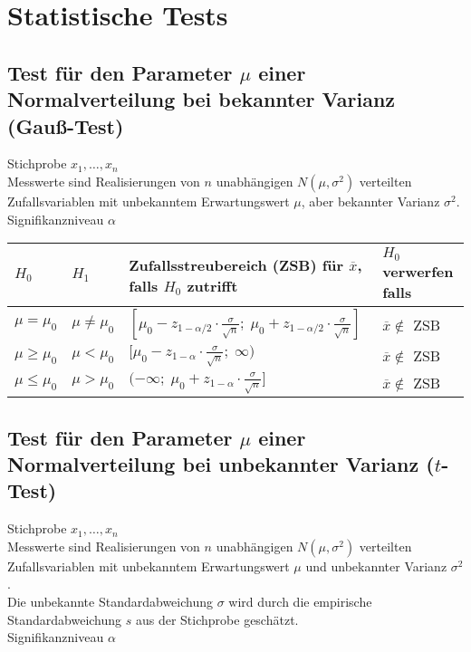 \section{Statistische Tests}

\subsection{Test für den Parameter $\mu$ einer Normalverteilung bei bekannter Varianz (Gauß-Test)}
Stichprobe $x_1, \ldots , x_n$\\
Messwerte sind Realisierungen von $n$ unabhängigen $N(\mu, \sigma^2)$ verteilten Zufallsvariablen mit unbekanntem Erwartungswert $\mu$, aber bekannter Varianz $\sigma^2$.\\
Signifikanzniveau $\alpha$\\

\begin{tabular}{llll}
	$H_0$ 		& $H_1$ 		& Zufallsstreubereich (ZSB) für $\overline{x}$, falls $H_0$ zutrifft & $H_0$ verwerfen falls\\
	\toprule
	$\mu = \mu_0$ 	& $\mu \ne \mu_0$ 	& $[\mu_0 - z_{1-\alpha /2} \cdot \frac{\sigma}{\sqrt{n}} ; \;
	\mu_0 + z_{1-\alpha /2} \cdot \frac{\sigma}{\sqrt{n}}]$  & $\overline{x} \not\in$ ZSB \\
	$\mu \ge \mu_0$ & $\mu < \mu_0$ & $[\mu_0 - z_{1-\alpha} \cdot \frac{\sigma}{\sqrt{n}} ; \;
	\infty)$ & $\overline{x} \not\in$ ZSB \\
	$\mu \le \mu_0$ & $\mu > \mu_0$ & $(-\infty ; \;
	\mu_0 + z_{1-\alpha} \cdot \frac{\sigma}{\sqrt{n}}]$  & $\overline{x} \not\in$ ZSB 
\end{tabular}


\subsection{Test für den Parameter $\mu$ einer Normalverteilung bei unbekannter Varianz ($t$-Test)}

Stichprobe $x_1, \ldots , x_n$\\
Messwerte sind Realisierungen von $n$ unabhängigen $N(\mu, \sigma^2)$ verteilten Zufallsvariablen mit unbekanntem Erwartungswert $\mu$ und unbekannter Varianz $\sigma^2$.\\
Die unbekannte Standardabweichung $\sigma$ wird durch die empirische Standardabweichung $s$ aus der Stichprobe geschätzt.\\
Signifikanzniveau $\alpha$\\


